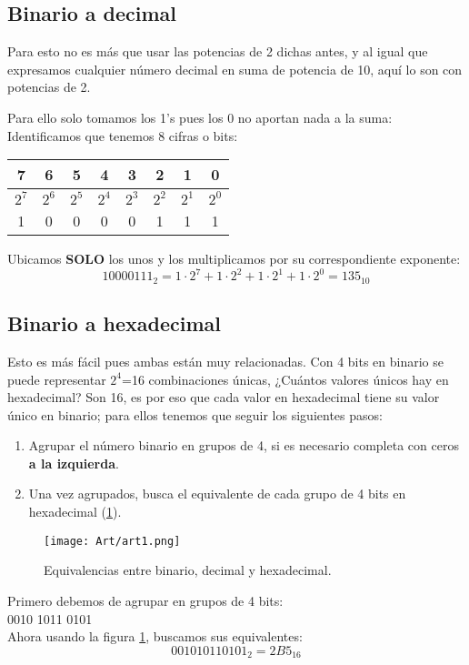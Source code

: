 \documentclass[
	12pt, %
	fleqn, %
	a4paper, %
	oneside, %
]{LegrandOrangeBook}
\begin{document}
\subsection{Binario a decimal}
Para esto no es más que usar las potencias de 2 dichas antes, y al igual que expresamos cualquier número decimal en suma de potencia de 10, aquí lo son con potencias de 2.
\begin{example}
Para ello solo tomamos los 1's pues los 0 no aportan nada a la suma:\\
Identificamos que tenemos 8 cifras o bits:
\begin{center}
\begin{tabular}{|c|c|c|c|c|c|c|c|}
\hline
7     & 6     & 5     & 4     & 3     & 2     & 1     & 0     \\ \hline
$2^7$ & $2^6$ & $2^5$ & $2^4$ & $2^3$ & $2^2$ & $2^1$ & $2^0$ \\ \hline
1     & 0     & 0     & 0     & 0     & 1     & 1     & 1     \\ \hline
\end{tabular}
\end{center}
Ubicamos \textbf{SOLO} los unos y los multiplicamos por su correspondiente exponente:
\begin{displaymath}
1000 0111_2=1\cdot 2^7 + 1\cdot 2^2 + 1\cdot 2^1 + 1\cdot 2^0=135_{10}
\end{displaymath}
\end{example}
\subsection{Binario a hexadecimal}
Esto es más fácil pues ambas están muy relacionadas. Con 4 bits en binario se puede representar $2^4$=16 combinaciones únicas, ¿Cuántos valores únicos hay en hexadecimal? Son 16, es por eso que cada valor en hexadecimal tiene su valor único en binario; para ellos tenemos que seguir los siguientes pasos:
\begin{enumerate}
\item Agrupar el número binario en grupos de 4, si es necesario completa con  ceros \textbf{a la izquierda}.
\item Una vez agrupados, busca el equivalente de cada grupo de 4 bits en hexadecimal (\ref{fig: bin a hex}).
\end{enumerate}
\begin{figure}[]
\centering
\texttt{[image: Art/art1.png]}
\caption{Equivalencias entre binario, decimal y hexadecimal.}
\label{fig: bin a hex}
\end{figure}
\begin{example}
Primero debemos de agrupar en grupos de 4 bits:\\
0010 1011 0101\\
Ahora usando la figura \ref{fig: bin a hex}, buscamos sus equivalentes:
\begin{displaymath}
0010 1011 0101_2=2B5_{16}
\end{displaymath}
\end{example}
\end{document}
